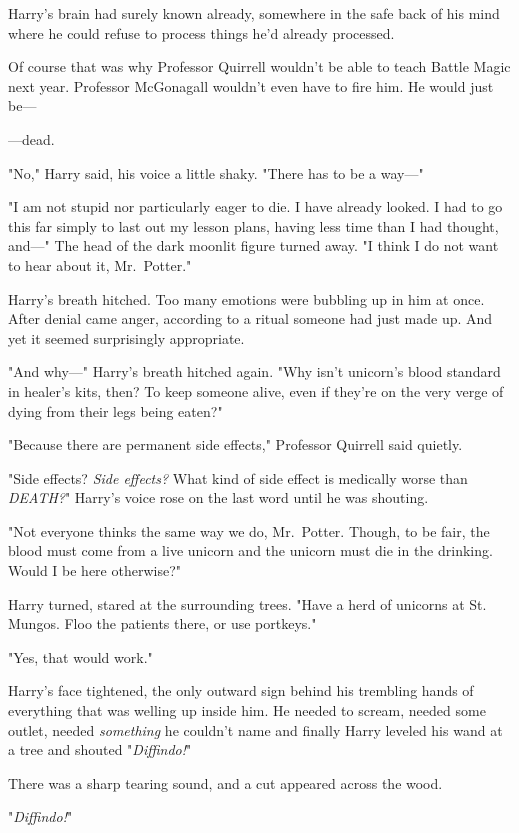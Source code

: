 Harry's brain had surely known already, somewhere in the safe back of his mind 
where he could refuse to process things he'd already processed.

Of course that was why Professor Quirrell wouldn't be able to teach Battle 
Magic next year. Professor McGonagall wouldn't even have to fire him. He would 
just be---

---dead.

"No," Harry said, his voice a little shaky. "There has to be a way---"

"I am not stupid nor particularly eager to die. I have already looked. I had to 
go this far simply to last out my lesson plans, having less time than I had 
thought, and---" The head of the dark moonlit figure turned away. "I think I do 
not want to hear about it, Mr.~Potter."

Harry's breath hitched. Too many emotions were bubbling up in him at once. 
After denial came anger, according to a ritual someone had just made up. And 
yet it seemed surprisingly appropriate.

"And why---" Harry's breath hitched again. "Why isn't unicorn's blood standard 
in healer's kits, then? To keep someone alive, even if they're on the very 
verge of dying from their legs being eaten?"

"Because there are permanent side effects," Professor Quirrell said quietly.

"Side effects? \emph{Side effects?} What kind of side effect is medically worse 
than \emph{DEATH?}" Harry's voice rose on the last word until he was shouting.

"Not everyone thinks the same way we do, Mr.~Potter. Though, to be fair, the 
blood must come from a live unicorn and the unicorn must die in the drinking. 
Would I be here otherwise?"

Harry turned, stared at the surrounding trees. "Have a herd of unicorns at St. 
Mungos. Floo the patients there, or use portkeys."

"Yes, that would work."

Harry's face tightened, the only outward sign behind his trembling hands of 
everything that was welling up inside him. He needed to scream, needed some 
outlet, needed \emph{something} he couldn't name and finally Harry leveled his 
wand at a tree and shouted "\emph{Diffindo!}"

There was a sharp tearing sound, and a cut appeared across the wood.

"\emph{Diffindo!}"

